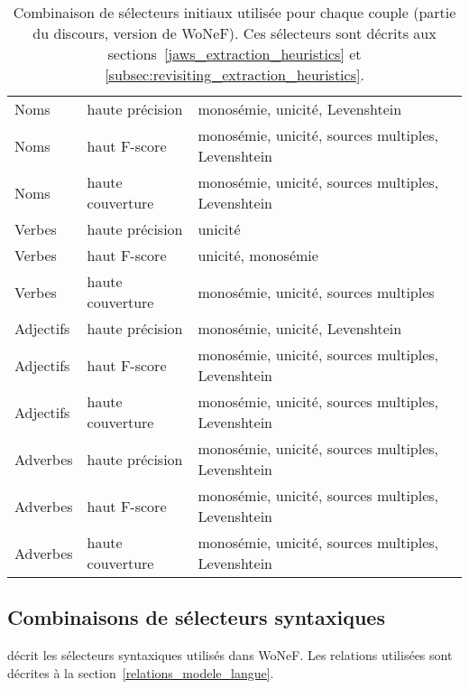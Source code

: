 \documentclass[oneside,parskip,draft]{scrbook}
\begin{document}
\begin{table}[ht]
    \centering
    \begin{tabular}{lll}
        \toprule
        Noms &  haute précision &  monosémie, unicité, Levenshtein \\
        Noms &  haut F-score    &  monosémie, unicité, sources multiples, Levenshtein \\
        Noms &  haute couverture  &  monosémie, unicité, sources multiples, Levenshtein \\
        \midrule
        Verbes &  haute précision &  unicité \\
        Verbes &  haut F-score    &  unicité, monosémie \\
        Verbes &  haute couverture  &  monosémie, unicité, sources multiples \\
        \midrule
        Adjectifs  &  haute précision &  monosémie, unicité, Levenshtein \\
        Adjectifs  &  haut F-score    &  monosémie, unicité, sources multiples, Levenshtein \\
        Adjectifs  &  haute couverture  &  monosémie, unicité, sources multiples, Levenshtein \\
        \midrule
        Adverbes  &  haute précision &  monosémie, unicité, sources multiples, Levenshtein \\
        Adverbes  &  haut F-score    &  monosémie, unicité, sources multiples, Levenshtein \\
        Adverbes  &  haute couverture  &  monosémie, unicité, sources multiples, Levenshtein \\
        \bottomrule
    \end{tabular}
    \caption{Combinaison de sélecteurs initiaux utilisée pour chaque couple
    (partie du discours, version de WoNeF). Ces sélecteurs sont décrits aux
sections~\ref{jaws_extraction_heuristics} et
\ref{subsec:revisiting_extraction_heuristics}.}
\end{table}

\subsection{Combinaisons de sélecteurs syntaxiques}

\cite[section 3.1.1.3]{mouton2010phd} décrit les sélecteurs syntaxiques
utilisés dans WoNeF. Les relations utilisées sont décrites à la
section~\ref{relations_modele_langue}.
\end{document}
